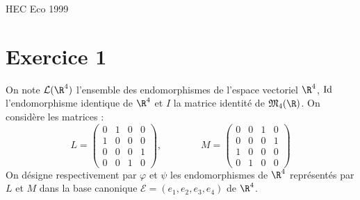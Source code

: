 \documentclass[11pt]{article}%
\begin{document}
\begin{center}
{\huge HEC Eco 1999}
\end{center}

\section*{Exercice 1}

On note $\mathcal{L}(\R^{4})$ l'ensemble des endomorphismes de
l'espace vectoriel $\R^{4}$, $\operatorname{Id}$ l'endomorphisme identique
de $\R^{4}$ et $I$ la matrice identité de $\mathfrak{M}_{4}(\R)$. On
considère les matrices :
\[
L = \left(
\begin{array}{rrrr}
0 & 1 & 0 & 0 \\
1 & 0 & 0 & 0 \\
0 & 0 & 0 & 1 \\
0 & 0 & 1 & 0
\end{array}
\right),\qquad \qquad M = \left(
\begin{array}{rrrr}
0 & 0 & 1 & 0 \\
0 & 0 & 0 & 1 \\
1 & 0 & 0 & 0 \\
0 & 1 & 0 & 0
\end{array}
\right)
\]
On désigne respectivement par $\varphi $ et $\psi $ les endomorphismes
de $\R^{4}$ représentés par $L$ et $M$ dans la base canonique
$\mathcal{E} = (e_{1},e_{2},e_{3},e_{4})$ de $\R^{4}$.
\end{document}
